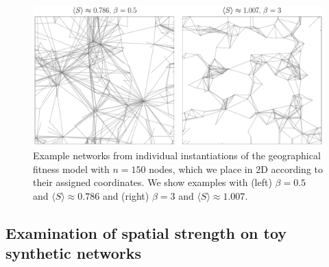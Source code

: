 \documentclass[%
 reprint,
 amsmath,amssymb,
 aps,
]{revtex4-1}
\begin{document}




\begin{figure}
    \centering
    \includegraphics[width=1.0\linewidth]{geographic_example_no_highlight2horiz.pdf}
    \caption{Example networks from individual instantiations of the geographical fitness model with $n=150$ nodes, which we place in 2D according to their assigned coordinates. We show examples with (left) $\beta = 0.5$ and $\langle S \rangle \approx 0.786$ and (right) $\beta = 3$ and $\langle S \rangle \approx 1.007$. 
    }
    \label{fig:network_visualizations}
\end{figure}


\subsection{Examination of spatial strength on toy synthetic networks}
\end{document}
